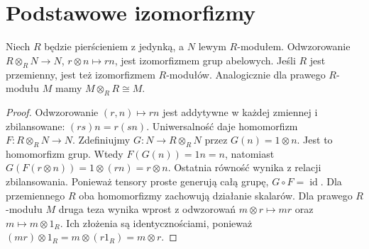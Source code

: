 \section{Podstawowe izomorfizmy}
\begin{twierdzenie}
\label{aa:tw:tensor-unit}
Niech $R$ będzie pierścieniem z jedynką, a $N$
lewym $R$-modułem. Odwzorowanie
$R\otimes_RN\to N$, $r\otimes n\mapsto rn$,
jest izomorfizmem grup abelowych. Jeśli $R$ jest
przemienny, jest też izomorfizmem $R$-modułów.
Analogicznie dla prawego $R$-modułu $M$ mamy
$M\otimes_RR\cong M$.
\end{twierdzenie}
\begin{proof}
Odwzorowanie $(r,n)\mapsto rn$ jest addytywne
w każdej zmiennej i zbilansowane: $(rs)n=r(sn)$.
Uniwersalność daje homomorfizm $F:R\otimes_RN\to N$.
Zdefiniujmy $G:N\to R\otimes_RN$ przez $G(n)=1\otimes n$.
Jest to homomorfizm grup. Wtedy
$F(G(n))=1n=n$, natomiast
$G(F(r\otimes n))=1\otimes(rn)=r\otimes n$.
Ostatnia równość wynika z relacji zbilansowania.
Ponieważ tensory proste generują całą grupę,
$G\circ F=\operatorname{id}$. Dla przemiennego $R$
oba homomorfizmy zachowują działanie skalarów.
Dla prawego $R$-modułu $M$ druga teza wynika wprost
z odwzorowań $m\otimes r\mapsto mr$ oraz
$m\mapsto m\otimes1_R$. Ich złożenia są identycznościami,
ponieważ $(mr)\otimes1_R=m\otimes(r1_R)=m\otimes r$.
\end{proof}

